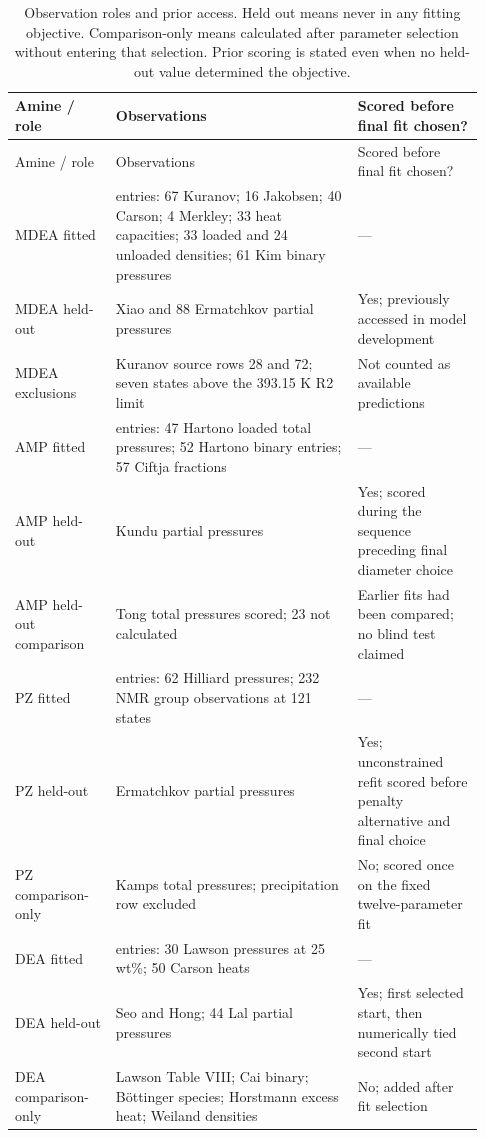\begin{longtable}{@{}>{\raggedright\arraybackslash}p{0.2\linewidth}>{\raggedright\arraybackslash}p{0.48\linewidth}>{\raggedright\arraybackslash}p{0.25\linewidth}@{}}
\caption{Observation roles and prior access. Held out means never in any fitting objective. Comparison-only means calculated after parameter selection without entering that selection. Prior scoring is stated even when no held-out value determined the objective.}\label{tab:p2-data-roles}\\
\toprule Amine / role & Observations & Scored before final fit chosen? \\ \midrule\endfirsthead
\toprule Amine / role & Observations & Scored before final fit chosen? \\ \midrule\endhead
\bottomrule\endfoot
MDEA fitted & 278 entries: 67 Kuranov; 16 Jakobsen; 40 Carson; 4 Merkley; 33 heat capacities; 33 loaded and 24 unloaded densities; 61 Kim binary pressures & --- \\
MDEA held-out & 20 Xiao and 88 Ermatchkov partial pressures & Yes; previously accessed in model development \\
MDEA exclusions & Kuranov source rows 28 and 72; seven states above the 393.15 K R2 limit & Not counted as available predictions \\
AMP fitted & 156 entries: 47 Hartono loaded total pressures; 52 Hartono binary entries; 57 Ciftja fractions & --- \\
AMP held-out & 51 Kundu partial pressures & Yes; scored during the sequence preceding final diameter choice \\
AMP held-out comparison & 17 Tong total pressures scored; 23 not calculated & Earlier fits had been compared; no blind test claimed \\
PZ fitted & 294 entries: 62 Hilliard pressures; 232 NMR group observations at 121 states & --- \\
PZ held-out & 52 Ermatchkov partial pressures & Yes; unconstrained refit scored before penalty alternative and final choice \\
PZ comparison-only & 94 Kamps total pressures; precipitation row excluded & No; scored once on the fixed twelve-parameter fit \\
DEA fitted & 80 entries: 30 Lawson pressures at 25 wt\%; 50 Carson heats & --- \\
DEA held-out & 16 Seo and Hong; 44 Lal partial pressures & Yes; first selected start, then numerically tied second start \\
DEA comparison-only & Lawson Table VIII; Cai binary; Böttinger species; Horstmann excess heat; Weiland densities & No; added after fit selection \\
\end{longtable}\endgroup
